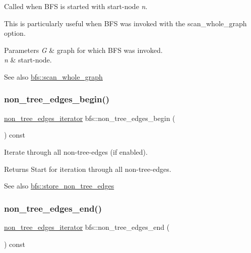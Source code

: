 Called when B\+FS is started with start-\/node {\itshape n}. 

This is particularly useful when B\+FS was invoked with the {\ttfamily scan\+\_\+whole\+\_\+graph} option.


\begin{DoxyParams}{Parameters}
{\em G} & graph for which B\+FS was invoked. \\
\hline
{\em n} & start-\/node. \\
\hline
\end{DoxyParams}
\begin{DoxySeeAlso}{See also}
\mbox{\hyperlink{classbfs_a25fc51b1bfbbdd3afefe0a84c1bd2f6b}{bfs\+::scan\+\_\+whole\+\_\+graph}} 
\end{DoxySeeAlso}
\mbox{\label{classbfs_a06d02d2643f184b4c086678771f0ff90}} 
\subsubsection{\texorpdfstring{non\+\_\+tree\+\_\+edges\+\_\+begin()}{non\_tree\_edges\_begin()}}
{\footnotesize\ttfamily \mbox{\hyperlink{classbfs_aecd86c7c1f1086d4b6b11c2a0eb12afe}{non\+\_\+tree\+\_\+edges\+\_\+iterator}} bfs\+::non\+\_\+tree\+\_\+edges\+\_\+begin (\begin{DoxyParamCaption}{ }\end{DoxyParamCaption}) const\hspace{0.3cm}{\ttfamily [inline]}}



Iterate through all non-\/tree-\/edges (if enabled). 

\begin{DoxyReturn}{Returns}
Start for iteration through all non-\/tree-\/edges. 
\end{DoxyReturn}
\begin{DoxySeeAlso}{See also}
\mbox{\hyperlink{classbfs_a7de47b820fb9532f497660f767c9457f}{bfs\+::store\+\_\+non\+\_\+tree\+\_\+edges}} 
\end{DoxySeeAlso}
\mbox{\label{classbfs_a9fb470cd36eb487004ca28c1723cabda}} 
\subsubsection{\texorpdfstring{non\+\_\+tree\+\_\+edges\+\_\+end()}{non\_tree\_edges\_end()}}
{\footnotesize\ttfamily \mbox{\hyperlink{classbfs_aecd86c7c1f1086d4b6b11c2a0eb12afe}{non\+\_\+tree\+\_\+edges\+\_\+iterator}} bfs\+::non\+\_\+tree\+\_\+edges\+\_\+end (\begin{DoxyParamCaption}{ }\end{DoxyParamCaption}) const\hspace{0.3cm}{\ttfamily [inline]}}



